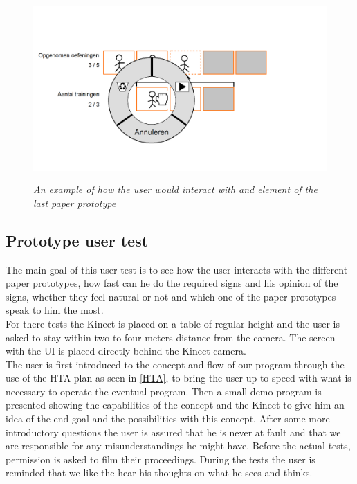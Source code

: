 \begin{figure}[H]
	\begin{center}
		\includegraphics[width=12.5cm, height=7cm]{figures/prototype_10_6_example.png}
		\caption{\emph{An example of how the user would interact with and element of the last paper prototype}}
		\label{example last prototype}
	\end{center}
\end{figure}

\subsection{Prototype user test}

The main goal of this user test is to see how the user interacts with the different paper prototypes, how fast can he do the required signs and his opinion of the signs, whether they feel natural or not and which one of the paper prototypes speak to him the most. \\

For there tests the Kinect is placed on a table of regular height and the user is asked to stay within two to four meters distance from the camera. The screen with the UI is placed directly behind the Kinect camera.\\

The user is first introduced to the concept and flow of our program through the use of the HTA plan as seen in \ref{HTA}, to bring the user up to speed with what is necessary to operate the eventual program. Then a small demo program is presented showing the capabilities of the concept and the Kinect to give him an idea of the end goal and the possibilities with this concept. After some more introductory questions the user is assured that he is never at fault and that we are responsible for any misunderstandings he might have. Before the actual tests, permission is asked to film their proceedings. During the tests the user is reminded that we like the hear his thoughts on what he sees and thinks.\\

